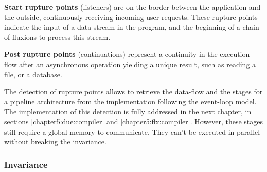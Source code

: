 \textbf{Start rupture points} (listeners) are on the border between the application and the outside, continuously receiving incoming user requests.
These rupture points indicate the input of a data stream in the program, and the beginning of a chain of fluxions to process this stream.

\textbf{Post rupture points} (continuations) represent a continuity in the execution flow after an asynchronous operation yielding a unique result, such as reading a file, or a database.






The detection of rupture points allows to retrieve the data-flow and the stages for a pipeline architecture from the implementation following the event-loop model.
The implementation of this detection is fully addressed in the next chapter, in sections \ref{chapter5:due:compiler} and \ref{chapter5:flx:compiler}.
However, these stages still require a global memory to communicate.
They can't be executed in parallel without breaking the invariance.





\subsubsection{Invariance}


